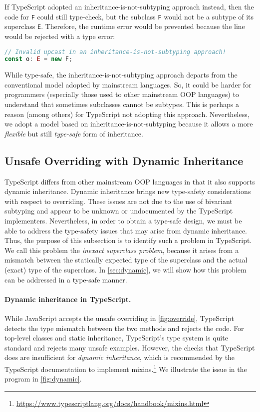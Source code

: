 If TypeScript adopted an inheritance-is-not-subtyping approach instead, then the
code for \lstinline{F} could still type-check, but the subclass \lstinline{F}
would not be a subtype of its superclass \lstinline{E}. Therefore, the runtime
error would be prevented because the line would be rejected with a type error:
\begin{lstlisting}[language=TypeScript]
// Invalid upcast in an inheritance-is-not-subtyping approach!
const o: E = new F;
\end{lstlisting}
While type-safe, the inheritance-is-not-subtyping approach departs from the
conventional model adopted by mainstream languages. So, it could be harder for
programmers (especially those used to other mainstream OOP languages) to
understand that sometimes subclasses cannot be subtypes. This is perhaps a
reason (among others) for TypeScript not adopting this approach. Nevertheless,
we adopt a model based on inheritance-is-not-subtyping because it allows a more
\emph{flexible} but still \emph{type-safe} form of inheritance.

\subsection{Unsafe Overriding with Dynamic Inheritance} \label{sec:override}

TypeScript differs from other mainstream OOP languages in that it also supports
dynamic inheritance. Dynamic inheritance brings new type-safety considerations
with respect to overriding. These issues are not due to the use of bivariant
subtyping and appear to be unknown or undocumented by the TypeScript
implementers. Nevertheless, in order to obtain a type-safe design, we must be
able to address the type-safety issues that may arise from dynamic inheritance.
Thus, the purpose of this subsection is to identify such a problem in
TypeScript. We call this problem the \emph{inexact superclass problem}, because
it arises from a mismatch between the statically expected type of the superclass
and the actual (exact) type of the superclass. In \autoref{sec:dynamic}, we will
show how this problem can be addressed in a type-safe manner.

\paragraph{Dynamic inheritance in TypeScript.}
While JavaScript accepts the unsafe overriding in \autoref{fig:override},
TypeScript detects the type mismatch between the two methods and rejects the
code. For top-level classes and static inheritance, TypeScript's type system is
quite standard and rejects many unsafe examples. However, the checks that
TypeScript does are insufficient for \emph{dynamic inheritance}, which is
recommended by the TypeScript documentation to implement
mixins.\footnote{\url{https://www.typescriptlang.org/docs/handbook/mixins.html}}
We illustrate the issue in the program in \autoref{fig:dynamic}.

